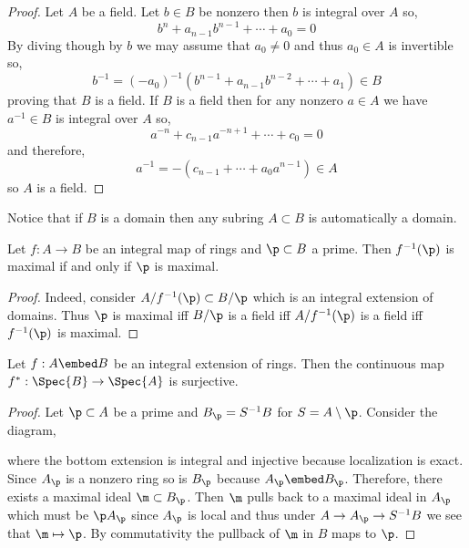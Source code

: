 \documentclass[12pt]{article}
\begin{document}
\begin{proof}
Let $A$ be a field. Let $b \in B$ be nonzero then $b$ is integral over $A$ so,
\[ b^n + a_{n-1} b^{n-1} + \cdots + a_0 = 0 \]
By diving though by $b$ we may assume that $a_0 \neq 0$ and thus $a_0 \in A$ is invertible so,
\[ b^{-1} = (-a_0)^{-1} (b^{n-1} + a_{n-1} b^{n-2} + \cdots + a_1) \in B \]
proving that $B$ is a field. If $B$ is a field then for any nonzero $a \in A$ we have $a^{-1} \in B$ is integral over $A$ so,
\[ a^{-n} + c_{n-1} a^{-n+1} + \cdots + c_0 = 0 \]
and therefore,
\[ a^{-1} = -(c_{n-1} + \cdots + a_0 a^{n-1}) \in A \]
so $A$ is a field.
\end{proof}

\begin{rmk}
Notice that if $B$ is a domain then any subring $A \subset B$ is automatically a domain. 
\end{rmk}

\begin{lemma}
Let $f : A \to B$ be an integral map of rings and $\p \subset B$ a prime. Then $f^{-1}(\p)$ is maximal if and only if $\p$ is maximal.
\end{lemma}

\begin{proof}
Indeed, consider $A / f^{-1}(\p) \subset B / \p$ which is an integral extension of domains. Thus $\p$ is maximal iff $B / \p$ is a field iff $A / f^{-1}(\p)$ is a field iff $f^{-1}(\p)$ is maximal.
\end{proof}

\begin{prop}
Let $f : A \embed B$ be an integral extension of rings. Then the continuous map $f^* : \Spec{B} \to \Spec{A}$ is surjective.
\end{prop}

\begin{proof}
Let $\p \subset A$ be a prime and $B_\p = S^{-1} B$ for $S = A \setminus \p$. Consider the diagram,
\begin{center}
\end{center}
where the bottom extension is integral and injective because localization is exact. Since $A_\p$ is a nonzero ring so is $B_\p$ because $A_\p \embed B_\p$. Therefore, there exists a maximal ideal $\m \subset B_\p$. Then $\m$ pulls back to a maximal ideal in $A_\p$ which must be $\p A_\p$ since $A_\p$ is local and thus under $A \to A_\p \to S^{-1} B$ we see that $\m \mapsto \p$. By commutativity the pullback of $\m$ in $B$ maps to $\p$.
\end{proof}
\end{document}
